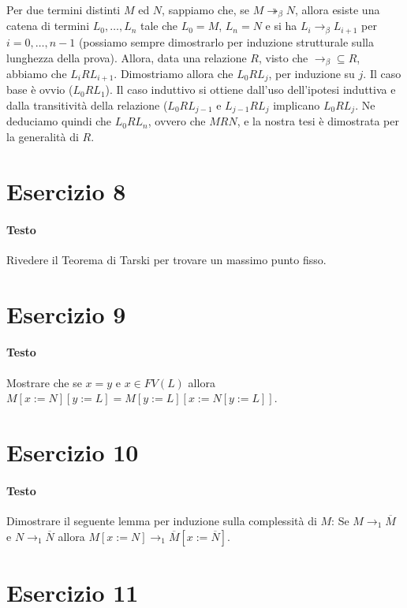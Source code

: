 \documentclass[a4paper,10pt]{article}
\begin{document}
Per due termini distinti $M$ ed $N$, sappiamo che, se $M \twoheadrightarrow_{\beta} N$, allora esiste una catena di termini $L_0,\dots,L_n$ tale che $L_0=M$, $L_n=N$ e si ha $L_i \rightarrow_{\beta} L_{i+1}$ per $i=0,\dots, n-1$ (possiamo sempre dimostrarlo per induzione strutturale sulla lunghezza della prova).
Allora, data una relazione $R$, visto che $\rightarrow_{\beta} \subseteq R$, abbiamo che $L_i R L_{i+1}$. Dimostriamo allora che $L_0RL_j$, per induzione su $j$.
Il caso base è ovvio ($L_0RL_1$). Il caso induttivo si ottiene dall'uso dell'ipotesi induttiva e dalla transitività della relazione ($L_0RL_{j-1}$ e $L_{j-1}RL_j$ implicano $L_0RL_j$.
Ne deduciamo quindi che $L_0RL_n$, ovvero che $MRN$, e la nostra tesi è dimostrata per la generalità di $R$. 



\section*{Esercizio 8}
\paragraph{Testo}
Rivedere il Teorema di Tarski per trovare un massimo punto fisso.

\section*{Esercizio 9}
\paragraph{Testo}
Mostrare che se $x = y$ e $x \in FV(L)$ allora $M [x := N ][y := L] = M [y := L][x :=N [y := L]]$.

\section*{Esercizio 10}
\paragraph{Testo}
Dimostrare il seguente lemma per induzione sulla complessità di $M$: Se $M \rightarrow_1 \overline{M}$ e $N \rightarrow_1 \overline{N}$ allora $M [x := N] \rightarrow_1 \overline{M} [x := \overline{N}]$.

\section*{Esercizio 11}
\end{document}
